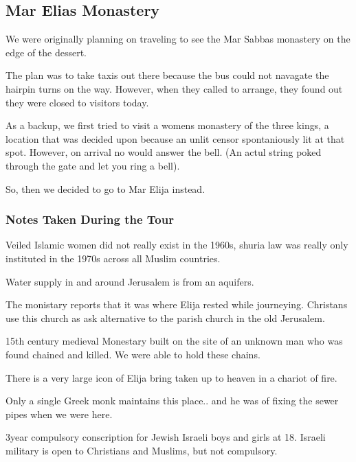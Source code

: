 \documentclass[letterpaper]{report}
\begin{document}
\subsection{Mar Elias Monastery}
\begin{multicols}{2}
We were originally planning on traveling to see the Mar Sabbas monastery on the edge of the dessert.

The plan was to take taxis out there because the bus could not navagate the hairpin turns on the way. However, when they called to arrange, they found out they were closed to visitors today.

As a backup, we first tried to visit a womens monastery of the three kings,
a location that was decided upon because an unlit censor spontaniously lit at that spot.
However, on arrival no would answer the bell. (An actul string poked through the gate and let you ring a bell).

So, then we decided to go to Mar Elija instead.

\subsubsection{Notes Taken During the Tour}
Veiled Islamic women did not really exist in the 1960s, shuria law was really only instituted in the 1970s across all Muslim countries.

Water supply in and around Jerusalem is from an aquifers.

The monistary reports that it was where Elija rested while journeying. Christans use this church as ask alternative to the parish church in the old Jerusalem. 

15th century medieval Monestary built on the site of an unknown man who was found chained and killed. We were able to hold these chains.

There is a very large icon of Elija bring taken up to heaven in a chariot of fire.

Only a single Greek monk maintains this place.. and he was of fixing the sewer pipes when we were here.

3year compulsory conscription for Jewish Israeli boys and girls at 18. Israeli military is open to Christians and Muslims, but not compulsory.
\end{multicols}
\end{document}
